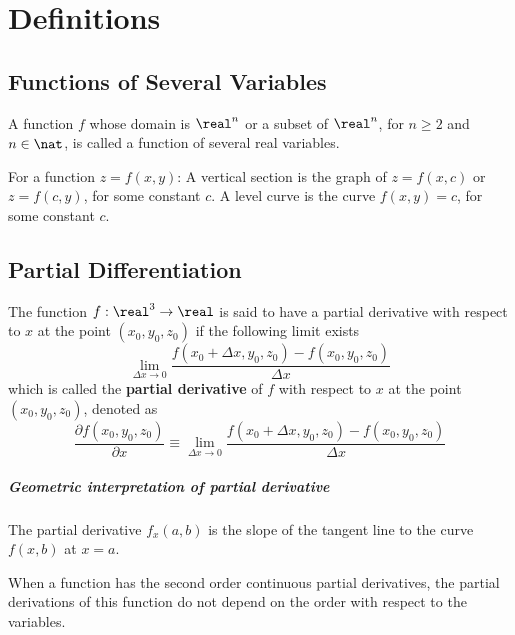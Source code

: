 \chapter{Definitions}
\theoremstyle{definition}

\section{Functions of Several Variables}
\begin{mydef}
\normalfont A function \(f\) whose domain is \(\real^n\) or a subset of \(\real^n\), for \(n \ge 2\) and \(n \in \nat\), is called a function of several real variables.
\end{mydef}

\begin{mydef}
\normalfont For a function \(z = f(x, y)\): A vertical section is the graph of \(z = f(x, c)\) or \(z = f(c, y)\), for some constant \(c\). A level curve is the curve \(f(x, y) = c\), for some constant \(c\).
\end{mydef}

\section{Partial Differentiation}
\begin{mydef}
\normalfont The function \(f : \real^3 \to \real\) is said to have a partial derivative with respect to \(x\) at the point \((x_0, y_0, z_0)\) if the following limit exists
%
\[\lim_{\Delta x \to 0}{\frac{f(x_0 + \Delta x, y_0, z_0) - f(x_0, y_0, z_0)}{\Delta x}}\]
%
which is called the \textbf{partial derivative} of \(f\) with respect to \(x\) at the point \((x_0, y_0, z_0)\), denoted as
%
\[\frac{\partial f(x_0, y_0, z_0)}{\partial x} \equiv \lim_{\Delta x \to 0}{\frac{f(x_0 + \Delta x, y_0, z_0) - f(x_0, y_0, z_0)}{\Delta x}}\]
\end{mydef}

\paragraph{Geometric interpretation of partial derivative} The partial derivative 
\(f_x(a,b)\) is the slope of the tangent line to the curve \(f(x, b)\) at \(x = a\).

\begin{mythm}\normalfont
When a function has the second order continuous partial derivatives, the partial derivations of this function do not depend on the order with respect to the variables.
\end{mythm}

